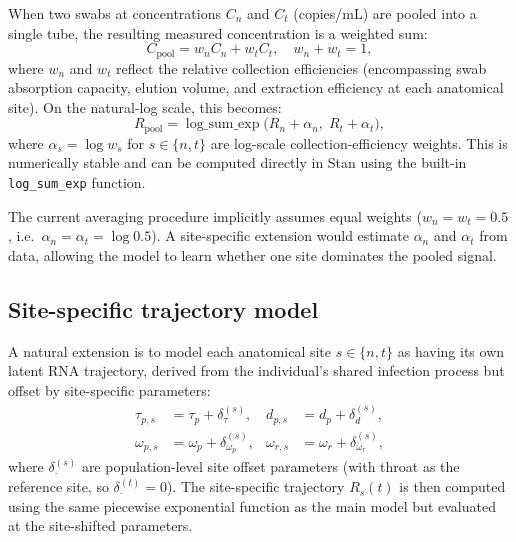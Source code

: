\begin{appendix}
    When two swabs at concentrations $C_n$ and $C_t$ (copies/mL) are pooled into a single tube, the resulting measured concentration is a weighted sum:
    \begin{equation}
        C_{\text{pool}} = w_n C_n + w_t C_t, \quad w_n + w_t = 1,
        \label{eq:pool_linear}
    \end{equation}
    where $w_n$ and $w_t$ reflect the relative collection efficiencies (encompassing swab absorption capacity, elution volume, and extraction efficiency at each anatomical site). On the natural-log scale, this becomes:
    \begin{equation}
        R_{\text{pool}} = \operatorname{log\_sum\_exp}\!\bigl(R_n + \alpha_n,\; R_t + \alpha_t\bigr),
        \label{eq:pool_log}
    \end{equation}
    where $\alpha_s = \log w_s$ for $s \in \{n, t\}$ are log-scale collection-efficiency weights. This is numerically stable and can be computed directly in Stan using the built-in \texttt{log\_sum\_exp} function.

    The current averaging procedure implicitly assumes equal weights ($w_n = w_t = 0.5$, i.e.\ $\alpha_n = \alpha_t = \log 0.5$). A site-specific extension would estimate $\alpha_n$ and $\alpha_t$ from data, allowing the model to learn whether one site dominates the pooled signal.

    \subsection{Site-specific trajectory model}

    A natural extension is to model each anatomical site $s \in \{n, t\}$ as having its own latent RNA trajectory, derived from the individual's shared infection process but offset by site-specific parameters:
    \begin{align}
        \tau_{p,s} &= \tau_p + \delta_\tau^{(s)}, &
        d_{p,s} &= d_p + \delta_d^{(s)}, \nonumber \\
        \omega_{p,s} &= \omega_p + \delta_{\omega_p}^{(s)}, &
        \omega_{r,s} &= \omega_r + \delta_{\omega_r}^{(s)},
        \label{eq:site_offsets}
    \end{align}
    where $\delta_\cdot^{(s)}$ are population-level site offset parameters (with throat as the reference site, so $\delta_\cdot^{(t)} = 0$). The site-specific trajectory $R_s(t)$ is then computed using the same piecewise exponential function as the main model but evaluated at the site-shifted parameters.


\end{appendix}
